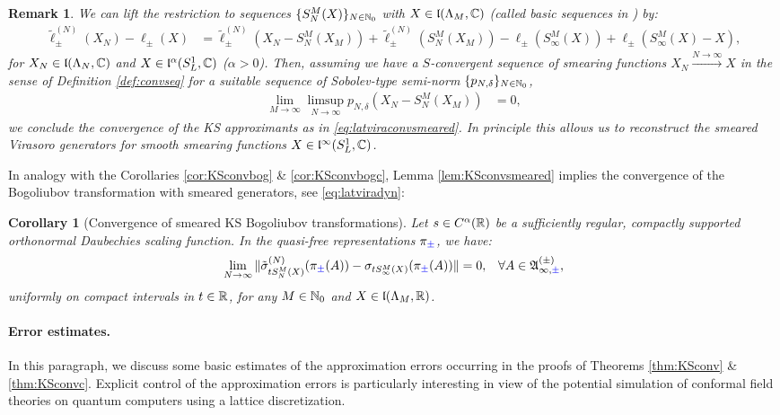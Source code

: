 \documentclass[a4paper, 11pt]{article}
\newcommand{\fA}{\mathfrak{A}}\newcommand{\cA}{\mathcal{A}}\newcommand{\dA}{\mathds{A}}\newcommand{\sA}{\mathscr{A}}
\newcommand{\fl}{\mathfrak{l}}\newcommand{\cl}{\mathcal{l}}
\DeclareMathOperator{\1}{\mathds{1}}
\newtheorem{cor}[thm]{Corollary}
\newtheorem{rem}[thm]{Remark}
\begin{document}
\begin{rem}
\label{rem:KSconvsmeared}
We can lift the restriction to sequences $\{S^{M}_{N}(X)\}_{N\in\mathbb{N}_{0}}$ with $X\in\fl(\Lambda_{M},\C)$ (called basic sequences in \cite{DuffieldMeanFieldDynamical}) by:
\begin{align*}
\tilde{\ell}^{(N)}_{\pm}(X_{N})\!-\!\ell_{\pm}(X) & \!=\!\tilde{\ell}^{(N)}_{\pm}(X_{N}\!-\!S^{M}_{N}(X_{M})\!)\!+\!\tilde{\ell}^{(N)}_{\pm}(S^{M}_{N}(X_{M})\!)\!-\!\ell_{\pm}(S^{M}_{\infty}(X)\!)\!+\!\ell_{\pm}(S^{M}_{\infty}(X)\!-\!X),
\end{align*}
for $X_{N}\in\fl(\Lambda_{N},\C)$ and $X\in\fl^{\alpha}(S^{1}_{L},\C)$ ($\alpha>0$). Then, assuming we have a $S$-convergent sequence of smearing functions $X_{N}\stackrel{N\rightarrow\infty}{\rightarrow} X$ in the sense of Definition \ref{def:convseq} for a suitable sequence of Sobolev-type semi-norm $\{p_{N,\delta}\}_{N\in\mathbb{N}_{0}}$,
\begin{align*}
\lim_{M\rightarrow\infty}\limsup_{N\rightarrow\infty}p_{N,\delta}(X_{N}-S^{M}_{N}(X_{M})\!) & = 0,
\end{align*}
we conclude the convergence of the KS approximants as in \eqref{eq:latviraconvsmeared}. In principle this allows us to reconstruct the smeared Virasoro generators for smooth smearing functions $X\in\fl^{\infty}(S^{1}_{L},\C)$.
\end{rem}
In analogy with the Corollaries \ref{cor:KSconvbog} \& \ref{cor:KSconvbogc}, Lemma \ref{lem:KSconvsmeared} implies the convergence of the Bogoliubov transformation with smeared generators, see \eqref{eq:latviradyn}:
\begin{cor}[Convergence of smeared KS Bogoliubov transformations]
\label{cor:KSconvbogsmeared}
Let $s\in C^{\alpha}(\mathbb{R})$ be a sufficiently regular, compactly supported orthonormal Daubechies scaling function. In the quasi-free representations $\pi_{{\color{blue}\pm}}$, we have:
\begin{align*}
\lim_{N\rightarrow\infty}\|\tilde{\sigma}^{(N)}_{tS^{M}_{N}(X)}(\pi_{{\color{blue}\pm}}(A)) - \sigma_{tS^{M}_{\infty}(X)}(\pi_{{\color{blue}\pm}}(A))\| & = 0, & \forall A\in\fA^{(\pm)}_{\infty,{\color{blue}\pm}},
\end{align*}
uniformly on compact intervals in $t\in\mathbb{R}$, for any $M\in\mathbb{N}_{0}$ and $X\in\fl(\Lambda_{M},\R)$.
\end{cor}

\paragraph{Error estimates.}
In this paragraph, we discuss some basic estimates of the approximation errors occurring in the proofs of Theorems \ref{thm:KSconv} \& \ref{thm:KSconvc}. Explicit control of the approximation errors is particularly interesting in view of the potential simulation of conformal field theories on quantum computers using a lattice discretization.
\end{document}
